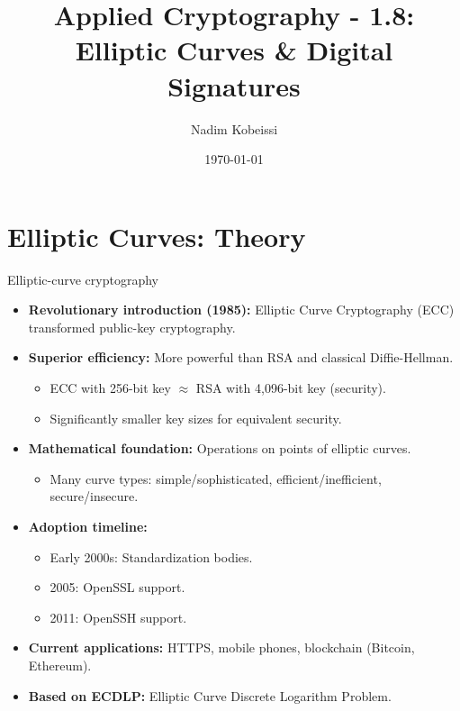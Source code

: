 \documentclass[aspectratio=169, lualatex, handout]{beamer}
\title{Applied Cryptography - 1.8: Elliptic Curves \& Digital Signatures}
\author{Nadim Kobeissi}
\institute{American University of Beirut}
\date{\today}
\begin{document}
\begin{frame}[plain]
	\titlepage
\end{frame}

\section{Elliptic Curves: Theory}

\begin{frame}{Elliptic-curve cryptography}
	\begin{itemize}
		\item \textbf{Revolutionary introduction (1985):} Elliptic Curve Cryptography (ECC) transformed public-key cryptography.
		\item \textbf{Superior efficiency:} More powerful than RSA and classical Diffie-Hellman.
		      \begin{itemize}
			      \item ECC with 256-bit key $\approx$ RSA with 4,096-bit key (security).
			      \item Significantly smaller key sizes for equivalent security.
		      \end{itemize}
		\item \textbf{Mathematical foundation:} Operations on points of elliptic curves.
		      \begin{itemize}
			      \item Many curve types: simple/sophisticated, efficient/inefficient, secure/insecure.
		      \end{itemize}
		\item \textbf{Adoption timeline:}
		      \begin{itemize}
			      \item Early 2000s: Standardization bodies.
			      \item 2005: OpenSSL support.
			      \item 2011: OpenSSH support.
		      \end{itemize}
		\item \textbf{Current applications:} HTTPS, mobile phones, blockchain (Bitcoin, Ethereum).
		\item \textbf{Based on ECDLP:} Elliptic Curve Discrete Logarithm Problem.
	\end{itemize}
\end{frame}
\end{document}
